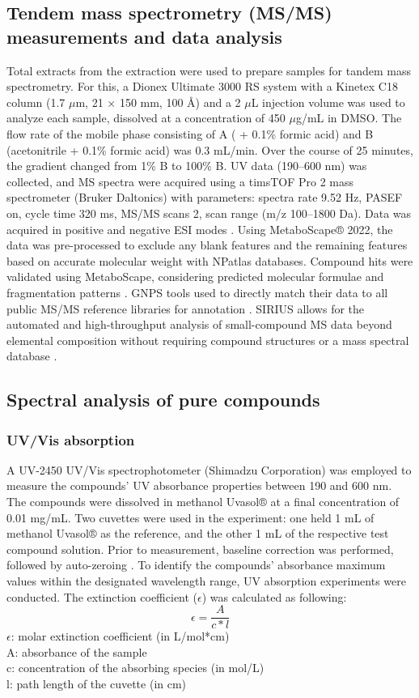 \subsection{Tendem mass spectrometry (MS/MS) measurements and data analysis}
Total extracts from the extraction were used to prepare samples for tandem mass spectrometry. For this, a Dionex Ultimate 3000 RS system with a Kinetex C18 column (1.7 $\mu$m, 21 × 150 mm, 100 Å) 
and a 2 $\mu$L injection volume was used to analyze each sample, dissolved at a concentration of 450 $\mu$g/mL in DMSO. The flow rate of the mobile phase consisting of A ( + 0.1\% formic acid) and B (acetonitrile + 0.1\% formic acid) was 0.3 mL/min. Over the course of 25 minutes, the gradient changed from 1\% B to 100\% B. UV data (190–600 nm) was collected, and MS spectra were acquired using a timsTOF Pro 2 mass spectrometer (Bruker Daltonics) with parameters: spectra rate 9.52 Hz, PASEF on, cycle time 320 ms, MS/MS scans 2, scan range (m/z 100–1800 Da). Data was acquired in positive and negative ESI modes \cite{Rita2023}. Using MetaboScape® 2022, the data was pre-processed to exclude any blank features and the remaining features based on accurate molecular weight with NPatlas databases. Compound hits were validated using MetaboScape, considering predicted molecular formulae and fragmentation patterns \cite{Wongkanoun2023}. GNPS tools used to directly match their data to all public MS/MS reference libraries for annotation \cite{Wang2016}. SIRIUS allows for the automated and high-throughput analysis of small-compound MS data beyond elemental composition without requiring compound structures or a mass spectral database \cite{sirius}.




\subsection{Spectral analysis of pure compounds}
\subsubsection{UV/Vis absorption}
A UV-2450 UV/Vis spectrophotometer (Shimadzu Corporation) was employed to measure the compounds' UV absorbance properties between 190 and 600 nm. The compounds were dissolved in methanol Uvasol® at a final concentration of 0.01 mg/mL. Two cuvettes were used in the experiment: one held 1 mL of methanol Uvasol® as the reference, and the other 1 mL of the respective test compound solution. Prior to measurement, baseline correction was performed, followed by auto-zeroing \cite{Ellens}.  To identify the compounds' absorbance maximum values within the designated wavelength range, UV absorption experiments were conducted. The extinction coefficient ($\epsilon$) was calculated as following: \[\epsilon = \frac{A}{c * l}\]
$\epsilon$: molar extinction coefficient (in L/mol*cm)\\
A: absorbance of the sample\\
c: concentration of the absorbing species (in mol/L)\\
l: path length of the cuvette (in cm)

